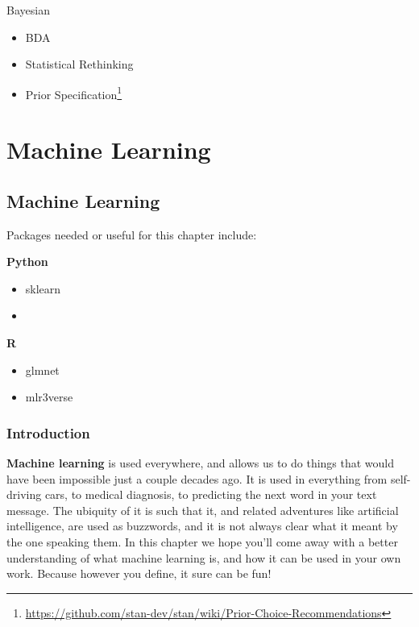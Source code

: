 \documentclass[
  letterpaper,
]{krantz}
\providecommand{\tightlist}{%
  \setlength{\itemsep}{0pt}\setlength{\parskip}{0pt}}\usepackage{longtable,booktabs,array}
\DeclareRobustCommand{\href}[2]{#2\footnote{\url{#1}}}
\begin{document}
Bayesian

\begin{itemize}
\tightlist
\item
  BDA
\item
  Statistical Rethinking
\item
  \href{https://github.com/stan-dev/stan/wiki/Prior-Choice-Recommendations}{Prior
  Specification}
\end{itemize}

\part{Machine Learning}

\chapter{Machine Learning}\label{machine-learning-1}

Packages needed or useful for this chapter include:

\textbf{Python}

\begin{itemize}
\tightlist
\item
  sklearn
\item
\end{itemize}

\textbf{R}

\begin{itemize}
\tightlist
\item
  glmnet
\item
  mlr3verse
\end{itemize}

\section{Introduction}\label{introduction-1}

\textbf{Machine learning} is used everywhere, and allows us to do things
that would have been impossible just a couple decades ago. It is used in
everything from self-driving cars, to medical diagnosis, to predicting
the next word in your text message. The ubiquity of it is such that it,
and related adventures like artificial intelligence, are used as
buzzwords, and it is not always clear what it meant by the one speaking
them. In this chapter we hope you'll come away with a better
understanding of what machine learning is, and how it can be used in
your own work. Because however you define, it sure can be fun!
\end{document}
